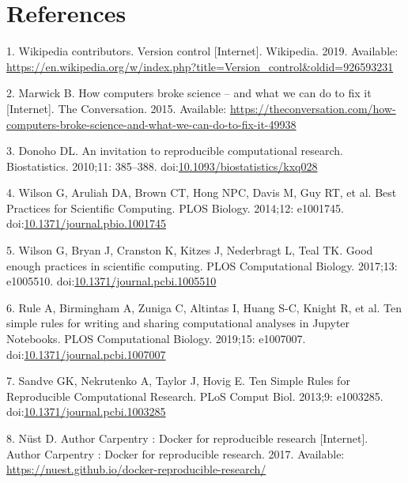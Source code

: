 \documentclass[10pt,letterpaper]{article}
\begin{document}
\hypertarget{references}{%
\section*{References}\label{references}}

\hypertarget{refs}{}
\leavevmode\hypertarget{ref-wikipedia_contributors_version_2019}{}%
1. Wikipedia contributors. Version control {[}Internet{]}. Wikipedia.
2019. Available:
\url{https://en.wikipedia.org/w/index.php?title=Version_control\&oldid=926593231}

\leavevmode\hypertarget{ref-marwick_how_2015}{}%
2. Marwick B. How computers broke science -- and what we can do to fix
it {[}Internet{]}. The Conversation. 2015. Available:
\url{https://theconversation.com/how-computers-broke-science-and-what-we-can-do-to-fix-it-49938}

\leavevmode\hypertarget{ref-donoho_invitation_2010}{}%
3. Donoho DL. An invitation to reproducible computational research.
Biostatistics. 2010;11: 385--388.
doi:\href{https://doi.org/10.1093/biostatistics/kxq028}{10.1093/biostatistics/kxq028}

\leavevmode\hypertarget{ref-wilson_best_2014}{}%
4. Wilson G, Aruliah DA, Brown CT, Hong NPC, Davis M, Guy RT, et al.
Best Practices for Scientific Computing. PLOS Biology. 2014;12:
e1001745.
doi:\href{https://doi.org/10.1371/journal.pbio.1001745}{10.1371/journal.pbio.1001745}

\leavevmode\hypertarget{ref-wilson_good_2017}{}%
5. Wilson G, Bryan J, Cranston K, Kitzes J, Nederbragt L, Teal TK. Good
enough practices in scientific computing. PLOS Computational Biology.
2017;13: e1005510.
doi:\href{https://doi.org/10.1371/journal.pcbi.1005510}{10.1371/journal.pcbi.1005510}

\leavevmode\hypertarget{ref-rule_ten_2019}{}%
6. Rule A, Birmingham A, Zuniga C, Altintas I, Huang S-C, Knight R, et
al. Ten simple rules for writing and sharing computational analyses in
Jupyter Notebooks. PLOS Computational Biology. 2019;15: e1007007.
doi:\href{https://doi.org/10.1371/journal.pcbi.1007007}{10.1371/journal.pcbi.1007007}

\leavevmode\hypertarget{ref-sandve_ten_2013}{}%
7. Sandve GK, Nekrutenko A, Taylor J, Hovig E. Ten Simple Rules for
Reproducible Computational Research. PLoS Comput Biol. 2013;9: e1003285.
doi:\href{https://doi.org/10.1371/journal.pcbi.1003285}{10.1371/journal.pcbi.1003285}

\leavevmode\hypertarget{ref-nust_author_2017}{}%
8. Nüst D. Author Carpentry : Docker for reproducible research
{[}Internet{]}. Author Carpentry : Docker for reproducible research.
2017. Available:
\url{https://nuest.github.io/docker-reproducible-research/}
\end{document}
